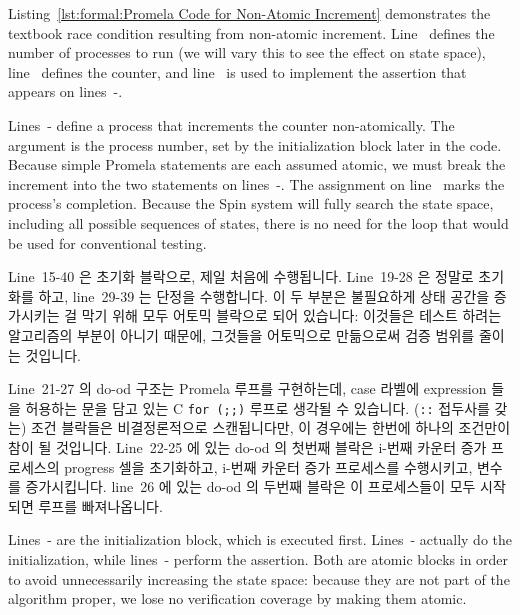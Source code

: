 \begin{lineref}
Listing~\ref{lst:formal:Promela Code for Non-Atomic Increment}
demonstrates the textbook race condition
resulting from non-atomic increment.
Line~ defines the number of processes to run (we will vary this
to see the effect on state space), line~ defines the counter,
and line~ is used to implement the assertion that appears on
lines~-.

Lines~- define a process that increments
the counter non-atomically.
The argument  is the process number, set by the initialization
block later in the code.
Because simple Promela statements are each assumed atomic, we must
break the increment into the two statements on
lines~-.
The assignment on line~ marks the process's completion.
Because the Spin system will fully search the state space, including
all possible sequences of states, there is no need for the loop
that would be used for conventional testing.
\fi

Line~15-40 은 초기화 블락으로, 제일 처음에 수행됩니다.
Line~19-28 은 정말로 초기화를 하고, line~29-39 는 단정을 수행합니다.
이 두 부분은 불필요하게 상태 공간을 증가시키는 걸 막기 위해 모두 어토믹
블락으로 되어 있습니다: 이것들은 테스트 하려는 알고리즘의 부분이 아니기 때문에,
그것들을 어토믹으로 만듦으로써 검증 범위를 줄이는 것입니다.

Line~21-27 의 do-od 구조는 Promela 루프를 구현하는데, case 라벨에 expression
들을 허용하는  문을 담고 있는 C {\tt for (;;)} 루프로 생각될 수
있습니다.
({\tt ::} 접두사를 갖는) 조건 블락들은 비결정론적으로 스캔됩니다만, 이 경우에는
한번에 하나의 조건만이 참이 될 것입니다.
Line~22-25 에 있는 do-od 의 첫번째 블락은 i-번째 카운터 증가 프로세스의
progress 셀을 초기화하고, i-번째 카운터 증가 프로세스를 수행시키고, 변수 
를 증가시킵니다.
line~26 에 있는 do-od 의 두번째 블락은 이 프로세스들이 모두 시작되면 루프를
빠져나옵니다.
\iffalse

Lines~- are the initialization block,
which is executed first.
Lines~- actually do the initialization,
while lines~-
perform the assertion.
Both are atomic blocks in order to avoid unnecessarily increasing
the state space: because they are not part of the algorithm proper,
we lose no verification coverage by making them atomic.


\end{lineref}

